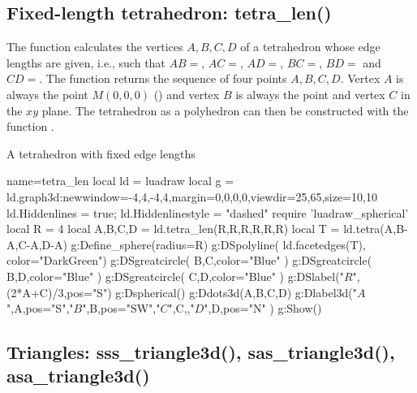 \subsection{Fixed-length tetrahedron: tetra\_len()}

The function  calculates the vertices $A,B,C,D$ of a tetrahedron whose edge lengths are given, i.e., such that $AB=$, $AC=$, $AD=$, $BC=$, $BD=$ and $CD=$. The function returns the sequence of four points $A,B,C,D$. Vertex $A$ is always the point $M(0,0,0)$ () and vertex $B$ is always the point  and vertex $C$ in the $xy$ plane. The tetrahedron as a polyhedron can then be constructed with the function .

\begin{demo}{A tetrahedron with fixed edge lengths}
\begin{luadraw}{name=tetra_len}
local ld = luadraw
local g = ld.graph3d:new{window={-4,4,-4,4},margin={0,0,0,0},viewdir={25,65},size={10,10}}
ld.Hiddenlines = true; ld.Hiddenlinestyle = "dashed"
require 'luadraw_spherical'
local R = 4
local A,B,C,D = ld.tetra_len(R,R,R,R,R,R)
local T = ld.tetra(A,B-A,C-A,D-A)
g:Define_sphere({radius=R})
g:DSpolyline( ld.facetedges(T), {color="DarkGreen"})
g:DSgreatcircle( {B,C},{color="Blue"} )
g:DSgreatcircle( {B,D},{color="Blue"} )
g:DSgreatcircle( {C,D},{color="Blue"}  )
g:DSlabel("$R$",(2*A+C)/3,{pos="S"})
g:Dspherical()
g:Ddots3d({A,B,C,D})
g:Dlabel3d("$A$",A,{pos="S"},"$B$",B,{pos="SW"},"$C$",C,{},"$D$",D,{pos="N"} )
g:Show()
\end{luadraw}
\end{demo}

\subsection{Triangles: sss\_triangle3d(), sas\_triangle3d(), asa\_triangle3d()}

